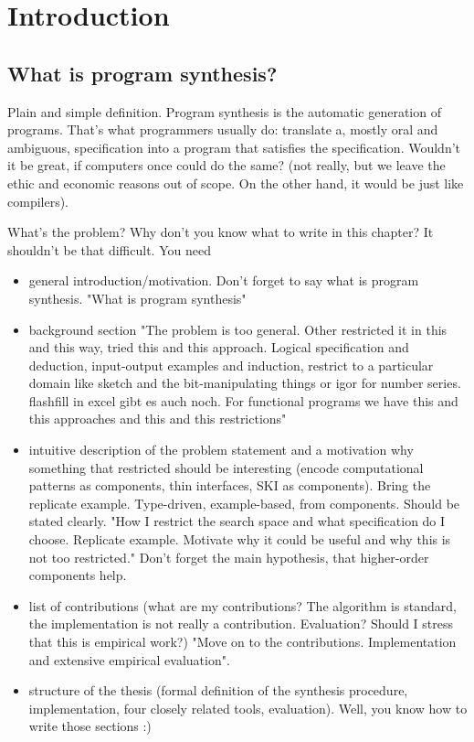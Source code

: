 \newcommand{\package}{\emph}

\chapter{Introduction}\label{ch:introduction}


\section{What is program synthesis?}

Plain and simple definition. Program synthesis is the automatic generation of programs. That's what programmers usually do: translate a, mostly oral and ambiguous, specification into a program that satisfies the specification. Wouldn't it be great, if computers once could do the same? (not really, but we leave the ethic and economic reasons out of scope. On the other hand, it would be just like compilers).

What's the problem? Why don't you know what to write in this chapter? It shouldn't be that difficult. You need
\begin{itemize}
\item general introduction/motivation. Don't forget to say what is program synthesis. "What is program synthesis"
\item background section "The problem is too general. Other restricted it in this and this way, tried this and this approach. Logical specification and deduction, input-output examples and induction, restrict to a particular domain like sketch and the bit-manipulating things or igor for number series. flashfill in excel gibt es auch noch. For functional programs we have this and this approaches and this and this restrictions"
\item intuitive description of the problem statement and a motivation why something that restricted should be interesting (encode computational patterns as components, thin interfaces, SKI as components). Bring the replicate example. Type-driven, example-based, from components. Should be stated clearly. "How I restrict the search space and what specification do I choose. Replicate example. Motivate why it could be useful and why this is not too restricted." Don't forget the main hypothesis, that higher-order components help.
\item list of contributions (what are my contributions? The algorithm is standard, the implementation is not really a contribution. Evaluation? Should I stress that this is empirical work?) "Move on to the contributions. Implementation and extensive empirical evaluation".
\item structure of the thesis (formal definition of the synthesis procedure, implementation, four closely related tools, evaluation). Well, you know how to write those sections :)
\end{itemize} 


